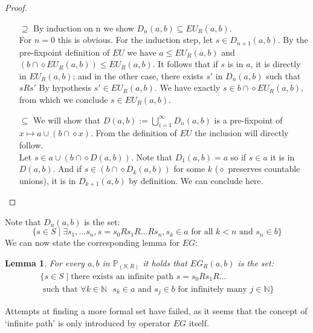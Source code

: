 \documentclass[11pt]{article}
\newtheorem{lemma}[definition]{Lemma}
\begin{document}
\begin{proof}
    \begin{itemize}
        \item[$\supseteq$] By induction on n we show $D_n(a,b) \subseteq EU_R(a,b)$.\\ For $n=0$ this is obvious. For the induction step, let $s\in D_{n+1}(a,b)$. By the pre-fixpoint definition of $EU$ we have $a\leq EU_R(a,b)$ and $(b\cap\diamond EU_R(a,b))\leq EU_R(a,b)$. It follows that if $s$ is in $a$, it is directly in $EU_R(a,b)$; and in the other case, there exists $s'$ in $D_n(a,b)$ such that $sRs'$ By hypothesis $s'\in EU_R(a,b)$. We have exactly $s\in b\cap\diamond EU_R(a,b)$, from which we conclude $s\in EU_R(a,b)$.
        \item[$\subseteq$] We will show that $D(a,b) := \bigcup_{i=1}^{\infty}D_n(a,b)$ is a pre-fixpoint of $x \mapsto a \cup (b \cap \diamond x)$. From the definition of $EU$ the inclusion will directly follow.\\ Let $s\in a \cup (b \cap \diamond D(a,b))$. Note that $D_1(a,b)=a$ so if $s\in a$ it is in $D(a,b)$. And if $s\in (b \cap \diamond D_k(a,b))$ for some $k$ ($\diamond$ preserves countable unions), it is in $D_{k+1}(a,b)$ by definition. We can conclude here.
    \end{itemize}
\end{proof}
Note that $D_n(a,b)$ is the set: \[\{s\in S\mid \exists s_1,...s_n, s=s_0Rs_1R...Rs_n, s_k\in a \mbox{ for all } k<n \mbox{ and } s_n \in b\}\]
We can now state the corresponding lemma for $EG$:
\begin{lemma}\label{EG_as_inters}
    For every $a,b$ in $\mathbb{P}_{(S,R)}$ it holds that $EG_R(a,b)$ is the set:
\begin{multline*}
    \{s\in S\mid \mbox{there exists an infinite path } s=s_0Rs_1R...\\
    \mbox{ such that }\forall k\in \mathbb{N} \mbox{ } s_k\in a\mbox{ and } s_{j}\in b \mbox{ for infinitely many } j \in\mathbb{N}\}
\end{multline*}
\end{lemma}
Attempts at finding a more formal set have failed, as it seems that the concept of `infinite path' is only introduced by operator $EG$ itself.
\end{document}
